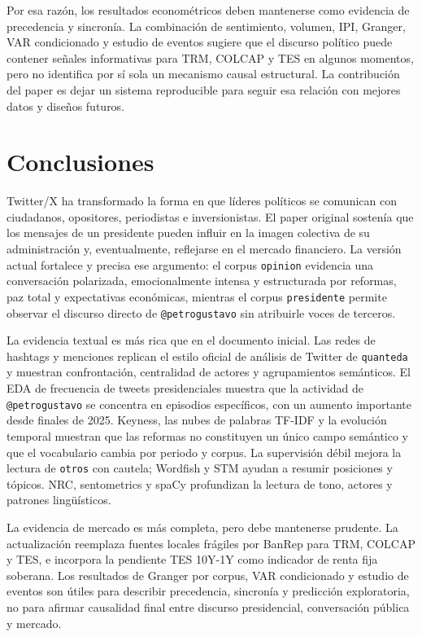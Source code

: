\documentclass[
]{interact}
\begin{document}
Por esa razón, los resultados econométricos deben mantenerse como
evidencia de precedencia y sincronía. La combinación de sentimiento,
volumen, IPI, Granger, VAR condicionado y estudio de eventos sugiere que
el discurso político puede contener señales informativas para TRM,
COLCAP y TES en algunos momentos, pero no identifica por sí sola un
mecanismo causal estructural. La contribución del paper es dejar un
sistema reproducible para seguir esa relación con mejores datos y
diseños futuros.

\section{Conclusiones}\label{conclusiones}

Twitter/X ha transformado la forma en que líderes políticos se comunican
con ciudadanos, opositores, periodistas e inversionistas. El paper
original sostenía que los mensajes de un presidente pueden influir en la
imagen colectiva de su administración y, eventualmente, reflejarse en el
mercado financiero. La versión actual fortalece y precisa ese argumento:
el corpus \texttt{opinion} evidencia una conversación polarizada,
emocionalmente intensa y estructurada por reformas, paz total y
expectativas económicas, mientras el corpus \texttt{presidente} permite
observar el discurso directo de \texttt{@petrogustavo} sin atribuirle
voces de terceros.

La evidencia textual es más rica que en el documento inicial. Las redes
de hashtags y menciones replican el estilo oficial de análisis de
Twitter de \texttt{quanteda} y muestran confrontación, centralidad de
actores y agrupamientos semánticos. El EDA de frecuencia de tweets
presidenciales muestra que la actividad de \texttt{@petrogustavo} se
concentra en episodios específicos, con un aumento importante desde
finales de 2025. Keyness, las nubes de palabras TF-IDF y la evolución
temporal muestran que las reformas no constituyen un único campo
semántico y que el vocabulario cambia por periodo y corpus. La
supervisión débil mejora la lectura de \texttt{otros} con cautela;
Wordfish y STM ayudan a resumir posiciones y tópicos. NRC, sentometrics
y spaCy profundizan la lectura de tono, actores y patrones lingüísticos.

La evidencia de mercado es más completa, pero debe mantenerse prudente.
La actualización reemplaza fuentes locales frágiles por BanRep para TRM,
COLCAP y TES, e incorpora la pendiente TES 10Y-1Y como indicador de
renta fija soberana. Los resultados de Granger por corpus, VAR
condicionado y estudio de eventos son útiles para describir precedencia,
sincronía y predicción exploratoria, no para afirmar causalidad final
entre discurso presidencial, conversación pública y mercado.
\end{document}
